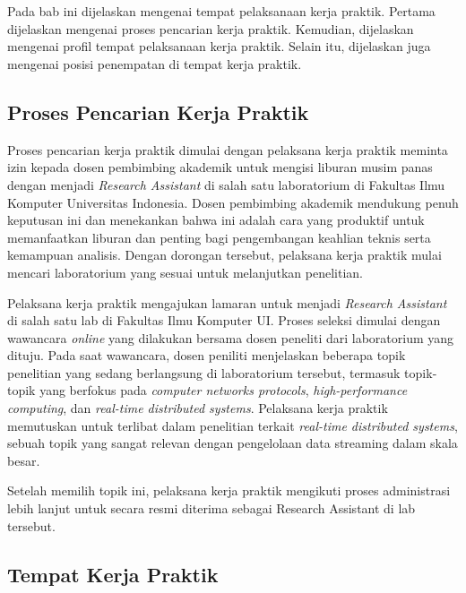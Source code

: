 \chapter{\babSatu}
\label{bab:1}

Pada bab ini dijelaskan mengenai tempat pelaksanaan kerja praktik. Pertama dijelaskan mengenai proses pencarian kerja praktik. Kemudian, dijelaskan mengenai profil tempat pelaksanaan kerja praktik. Selain itu, dijelaskan juga mengenai posisi penempatan di tempat kerja praktik.

\section{Proses Pencarian Kerja Praktik}
\label{sec:pencarian-kerja-praktik}

Proses pencarian kerja praktik dimulai dengan pelaksana kerja praktik meminta izin kepada dosen pembimbing akademik untuk mengisi liburan musim panas dengan menjadi \textit{Research Assistant} di salah satu laboratorium di Fakultas Ilmu Komputer Universitas Indonesia. Dosen pembimbing akademik mendukung penuh keputusan ini dan menekankan bahwa ini adalah cara yang produktif untuk memanfaatkan liburan dan penting bagi pengembangan keahlian teknis serta kemampuan analisis. Dengan dorongan tersebut, pelaksana kerja praktik mulai mencari laboratorium yang sesuai untuk melanjutkan penelitian.

Pelaksana kerja praktik mengajukan lamaran untuk menjadi \textit{Research Assistant} di salah satu lab di Fakultas Ilmu Komputer UI. Proses seleksi dimulai dengan wawancara \textit{online} yang dilakukan bersama dosen peneliti dari laboratorium yang dituju. Pada saat wawancara, dosen peniliti menjelaskan beberapa topik penelitian yang sedang berlangsung di laboratorium tersebut, termasuk topik-topik yang berfokus pada \textit{computer networks protocols}, \textit{high-performance computing}, dan \textit{real-time distributed systems}. Pelaksana kerja praktik memutuskan untuk terlibat dalam penelitian terkait \textit{real-time distributed systems}, sebuah topik yang sangat relevan dengan pengelolaan data streaming dalam skala besar.

Setelah memilih topik ini, pelaksana kerja praktik mengikuti proses administrasi lebih lanjut untuk secara resmi diterima sebagai Research Assistant di lab tersebut.

\section{Tempat Kerja Praktik}
\label{sec:tempat-kerja-praktik}

